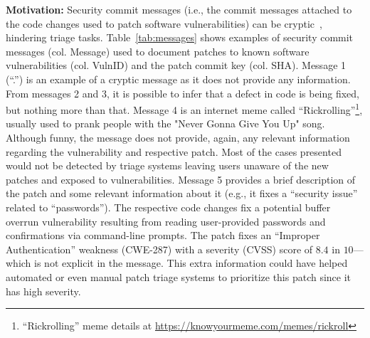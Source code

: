 \textbf{Motivation:} 
Security commit messages (i.e., the commit messages attached to the code changes used to patch software vulnerabilities) can be cryptic~\cite{9678720}, hindering triage tasks. 
Table~\ref{tab:messages} shows examples of security commit messages (col. Message) used to document patches to known software vulnerabilities (col. VulnID) and the 
patch commit key (col. SHA). Message 1 (``.'') is an example of a cryptic message as it does not provide any information. From messages 2 and 3, it
is possible to infer that a defect in code is being fixed, but nothing 
more than that. Message 4 is an internet meme called ``Rickrolling''\footnote{``Rickrolling'' meme details at \url{https://knowyourmeme.com/memes/rickroll}}, usually used to prank people with the "Never Gonna Give You Up" song. Although funny, the message does not provide, again, any relevant information regarding the vulnerability and respective patch. Most of the cases presented would not be detected by triage systems leaving users unaware of the new patches and exposed to vulnerabilities. Message 5  
provides a brief description of the patch and some relevant information about it (e.g., it fixes a ``security issue'' related to ``passwords''). The respective code changes fix a potential buffer overrun vulnerability resulting from reading user-provided passwords and confirmations via command-line prompts. The patch fixes an ``Improper Authentication'' weakness (CWE-287) with a severity (CVSS) score of $8.4$ in $10$---which 
is not explicit in the message. This extra information could have helped
automated or even manual patch triage systems to prioritize this patch since it has high severity. 



